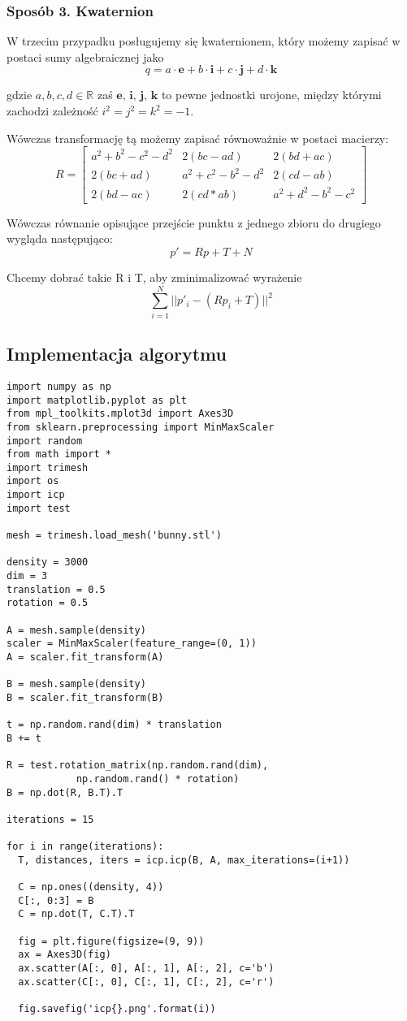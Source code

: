 \documentclass[12pt]{article}
\begin{document}
\subsubsection{Sposób 3. Kwaternion}
W trzecim przypadku posługujemy się kwaternionem, który możemy zapisać w postaci sumy algebraicznej jako
\[q = a \cdot \textbf{e} + b \cdot \textbf{i} + c \cdot \textbf{j} + d \cdot \textbf{k} \]

gdzie $a, b, c, d \in \mathbb{R}$ zaś $\textbf{e, i, j, k}$ to pewne jednostki urojone, między którymi zachodzi zależność $i^2 = j^2 = k^2 = -1$.

Wówczas transformację tą możemy zapisać równoważnie w postaci macierzy:
\[
R = \begin{bmatrix}
a^2+b^2-c^2-d^2 & 2(bc-ad) & 2(bd+ac) \\
2(bc+ad) & a^2+c^2-b^2-d^2 & 2(cd-ab) \\
2(bd-ac) & 2(cd*ab) & a^2+d^2-b^2-c^2
\end{bmatrix}
\]

Wówczas równanie opisujące przejście punktu z jednego zbioru do drugiego wygląda następująco:
\[p' = R p + T + N \]

Chcemy dobrać takie R i T, aby zminimalizować wyrażenie
\[ \sum_{i=1}^N || p'_{i} - (Rp_{i}+T)||^2 \]

\subsection{Implementacja algorytmu}
\begin{verbatim}
import numpy as np
import matplotlib.pyplot as plt
from mpl_toolkits.mplot3d import Axes3D
from sklearn.preprocessing import MinMaxScaler
import random
from math import *
import trimesh
import os
import icp
import test

mesh = trimesh.load_mesh('bunny.stl')

density = 3000
dim = 3
translation = 0.5
rotation = 0.5

A = mesh.sample(density)
scaler = MinMaxScaler(feature_range=(0, 1))
A = scaler.fit_transform(A)

B = mesh.sample(density)
B = scaler.fit_transform(B)

t = np.random.rand(dim) * translation
B += t

R = test.rotation_matrix(np.random.rand(dim), 
			np.random.rand() * rotation)
B = np.dot(R, B.T).T

iterations = 15

for i in range(iterations):
  T, distances, iters = icp.icp(B, A, max_iterations=(i+1))

  C = np.ones((density, 4))
  C[:, 0:3] = B
  C = np.dot(T, C.T).T

  fig = plt.figure(figsize=(9, 9))
  ax = Axes3D(fig)
  ax.scatter(A[:, 0], A[:, 1], A[:, 2], c='b')
  ax.scatter(C[:, 0], C[:, 1], C[:, 2], c='r')

  fig.savefig('icp{}.png'.format(i))
\end{verbatim}
\end{document}
